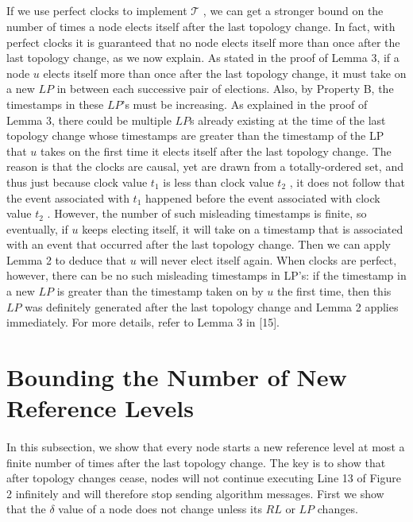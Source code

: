 \subparagraph{}If we use perfect clocks to implement $\mathcal{T}$ , we can get a stronger bound on the number of times a node elects itself after the last topology change. In fact, with perfect clocks it is guaranteed that no node elects itself more than once after the last topology change, as we now explain. As stated in the proof of Lemma 3, if a node $u$ elects itself more than once after the last topology change, it must take on a new $LP$ in between each successive pair of elections. Also, by Property B, the timestamps in these $LP$'s must be increasing. As explained in the proof of Lemma 3, there could be multiple $LP$s already existing at the time of the last topology change whose timestamps are greater than the timestamp of the LP that $u$ takes on the first time it elects itself after the last topology change. The reason is that the clocks are causal, yet are drawn from a totally-ordered set, and thus just because clock value $t_1$ is less than clock value $t_2$ , it does not follow that the event associated with $t_1$ happened before the event associated with clock value $t_2$ . However, the number of such misleading timestamps is finite, so eventually, if $u$ keeps electing itself, it will take on a timestamp that is associated with an event that occurred after the last topology change. Then we can apply Lemma 2 to deduce that $u$ will never elect itself again. When clocks are perfect, however, there can be no such misleading timestamps in LP's: if the timestamp in a new $LP$ is greater than the timestamp taken on by $u$ the first time, then this $LP$ was definitely generated after the last topology change and Lemma 2 applies immediately. For more details, refer to Lemma 3 in [15].
\section{Bounding the Number of New Reference Levels}
\paragraph{}In this subsection, we show that every node starts a new reference level at most a finite number of times after the last topology change. The key is to show that after topology changes cease, nodes will not continue executing Line 13 of Figure 2 infinitely and will therefore stop sending algorithm messages. First we show that the $\delta$ value of a node does not change unless its $RL$ or $LP$ changes.
